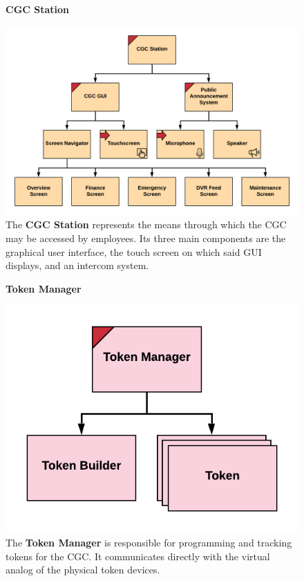 \documentclass[12pt]{article}
\begin{document}
\begin{figure}[H]
    \centering
    \textbf{CGC Station}\par
    \includegraphics[scale=.28]{CGC-Station.png}
    \caption{The \textbf{CGC Station} represents the means through which the CGC may be accessed by employees. 
    Its three main components are the graphical user interface, the touch screen on which said GUI displays, and
    an intercom system.}
    \label{fig:CGCStation}
\end{figure}

\begin{figure}[H]
    \centering
    \textbf{Token Manager}\par
    \includegraphics[scale=.40]{Token-Manager.png}
    \caption{The \textbf{Token Manager} is responsible for programming and tracking tokens for the CGC. It communicates 
    directly with the virtual analog of the physical token devices.}
    \label{fig:TokenManager}
\end{figure}
\end{document}
